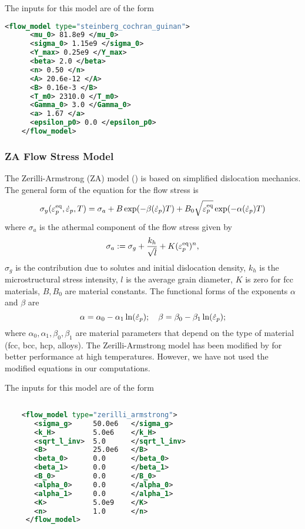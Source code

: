  The inputs for this model are of the form
  \begin{lstlisting}[language=XML]
    <flow_model type="steinberg_cochran_guinan">
      <mu_0> 81.8e9 </mu_0>
      <sigma_0> 1.15e9 </sigma_0>
      <Y_max> 0.25e9 </Y_max>
      <beta> 2.0 </beta>
      <n> 0.50 </n>
      <A> 20.6e-12 </A>
      <B> 0.16e-3 </B>
      <T_m0> 2310.0 </T_m0>
      <Gamma_0> 3.0 </Gamma_0>
      <a> 1.67 </a>
      <epsilon_p0> 0.0 </epsilon_p0>
    </flow_model>
  \end{lstlisting}

  \subsubsection{ZA Flow Stress Model}
  The Zerilli-Armstrong (ZA) model (\cite{Zerilli1987,Zerilli1993,Zerilli2004})
  is based on simplified dislocation mechanics.  The general form of the
  equation for the flow stress is
  \begin{equation}
    \sigma_y(\varepsilon_p^\text{eq},\dot{\varepsilon}_{p},T) = 
      \sigma_a + B\exp(-\beta(\dot{\varepsilon}_{p}) T) + 
                           B_0\sqrt{\varepsilon_p^\text{eq}}\exp(-\alpha(\dot{\varepsilon}_{p}) T)
  \end{equation}
  where $\sigma_a$ is the athermal component of the flow stress given by
  \begin{equation}
    \sigma_a := \sigma_g + \frac{k_h}{\sqrt{l}} + K(\varepsilon_p^\text{eq})^n,
  \end{equation}
  $\sigma_g$ is the contribution due to solutes and initial dislocation
  density, $k_h$ is the microstructural stress intensity, $l$ is the
  average grain diameter, $K$ is zero for fcc materials,
  $B, B_0$ are material constants.  The functional forms of the exponents
  $\alpha$ and $\beta$ are
  \begin{equation}
    \alpha = \alpha_0 - \alpha_1 \ln(\dot{\varepsilon}_{p}); \quad
    \beta = \beta_0 - \beta_1 \ln(\dot{\varepsilon}_{p}); 
  \end{equation}
  where $\alpha_0, \alpha_1, \beta_0, \beta_1$ are material parameters that
  depend on the type of material (fcc, bcc, hcp, alloys).  The Zerilli-Armstrong
  model has been modified by \cite{Abed2005} for better performance at high
  temperatures.  However, we have not used the modified equations in our
  computations.

  The inputs for this model are of the form
  \begin{lstlisting}[language=XML]
    
    <flow_model type="zerilli_armstrong">
       <sigma_g>     50.0e6   </sigma_g>
       <k_H>         5.0e6    </k_H>
       <sqrt_l_inv>  5.0      </sqrt_l_inv>
       <B>           25.0e6   </B>
       <beta_0>      0.0      </beta_0>
       <beta_1>      0.0      </beta_1>
       <B_0>         0.0      </B_0>
       <alpha_0>     0.0      </alpha_0>
       <alpha_1>     0.0      </alpha_1>
       <K>           5.0e9    </K>
       <n>           1.0      </n>
     </flow_model>
  \end{lstlisting}

